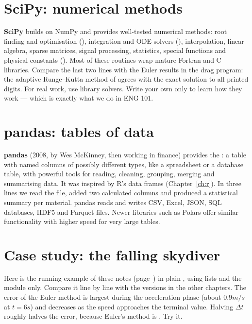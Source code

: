 \section{SciPy: numerical methods}

\textbf{SciPy} builds on NumPy and provides well-tested numerical methods: root finding and
optimisation (), integration and ODE solvers
(), interpolation, linear algebra, sparse matrices, signal
processing, statistics, special functions and physical constants
(). Most of these routines wrap mature Fortran and C libraries.
Compare the last two lines with the Euler results in the drag program: the adaptive
Runge--Kutta method of  agrees with the exact solution to all printed
digits. For real work, use library solvers. Write your own only to learn how they work ---
which is exactly what we do in ENG 101.

\section{pandas: tables of data}
\label{sec:pandas}

\textbf{pandas} (2008, by Wes McKinney, then working in finance) provides the
: a table with named columns of possibly different types, like a
spreadsheet or a database table, with powerful tools for reading, cleaning, grouping,
merging and summarising data. It was inspired by R's data frames (Chapter~\ref{ch:r}).
In three lines we read the file, added two calculated columns and produced a statistical
summary per material. pandas reads and writes CSV, Excel, JSON, SQL databases, HDF5 and
Parquet files. Newer libraries such as Polars offer similar functionality with higher
speed for very large tables.

\section{Case study: the falling skydiver}

Here is the running example of these notes (page~\pageref{sec:runningexample}) in
plain \py, using lists and the  module only. Compare it line by line with the
versions in the other chapters.
The error of the Euler method is largest during the acceleration phase (about
$0.9\unit{m/s}$ at $t = 6\unit{s}$) and decreases as the speed approaches the terminal
value. Halving $\Delta t$ roughly halves the error, because Euler's method is
. Try it.

